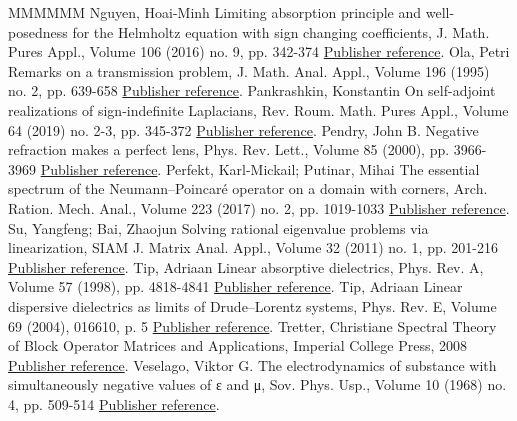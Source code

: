 \documentclass[11pt]{article}
\theoremstyle{definition}
\numberwithin{equation}{section}
\numberwithin{figure}{section}
\numberwithin{table}{section}
\begin{document}
\begin{thebibliography}{MMMMMM}
 Nguyen, Hoai-Minh Limiting absorption principle and well-posedness for the Helmholtz equation with sign changing coefficients, J. Math. Pures Appl., Volume 106 (2016) no. 9, pp. 342-374 \href{https://ahl.centre-mersenne.org/item/AHL_2020__3__1161_0/#Ngu-16}{Publisher reference}.
 Ola, Petri Remarks on a transmission problem, J. Math. Anal. Appl., Volume 196 (1995) no. 2, pp. 639-658 \href{https://ahl.centre-mersenne.org/item/AHL_2020__3__1161_0/#Ola-95}{Publisher reference}.
 Pankrashkin, Konstantin On self-adjoint realizations of sign-indefinite Laplacians, Rev. Roum. Math. Pures Appl., Volume 64 (2019) no. 2-3, pp. 345-372 \href{https://ahl.centre-mersenne.org/item/AHL_2020__3__1161_0/#Pan}{Publisher reference}.
 Pendry, John B. Negative refraction makes a perfect lens, Phys. Rev. Lett., Volume 85 (2000), pp. 3966-3969 \href{https://ahl.centre-mersenne.org/item/AHL_2020__3__1161_0/#Pen-00}{Publisher reference}.
 Perfekt, Karl-Mickail; Putinar, Mihai The essential spectrum of the Neumann–Poincaré operator on a domain with corners, Arch. Ration. Mech. Anal., Volume 223 (2017) no. 2, pp. 1019-1033 \href{https://ahl.centre-mersenne.org/item/AHL_2020__3__1161_0/#Per-Put-17}{Publisher reference}.
 Su, Yangfeng; Bai, Zhaojun Solving rational eigenvalue problems via linearization, SIAM J. Matrix Anal. Appl., Volume 32 (2011) no. 1, pp. 201-216 \href{https://ahl.centre-mersenne.org/item/AHL_2020__3__1161_0/#Su-Bai-11}{Publisher reference}.
 Tip, Adriaan Linear absorptive dielectrics, Phys. Rev. A, Volume 57 (1998), pp. 4818-4841 \href{https://ahl.centre-mersenne.org/item/AHL_2020__3__1161_0/#Tip-98}{Publisher reference}.
 Tip, Adriaan Linear dispersive dielectrics as limits of Drude–Lorentz systems, Phys. Rev. E, Volume 69 (2004), 016610, p. 5 \href{https://ahl.centre-mersenne.org/item/AHL_2020__3__1161_0/#Tip-04}{Publisher reference}.
 Tretter, Christiane Spectral Theory of Block Operator Matrices and Applications, Imperial College Press, 2008 \href{https://ahl.centre-mersenne.org/item/AHL_2020__3__1161_0/#Tre-08}{Publisher reference}.
 Veselago, Viktor G. The electrodynamics of substance with simultaneously negative values of ε and μ, Sov. Phys. Usp., Volume 10 (1968) no. 4, pp. 509-514 \href{https://ahl.centre-mersenne.org/item/AHL_2020__3__1161_0/#Ves-68}{Publisher reference}.
\end{thebibliography}
\end{document}
